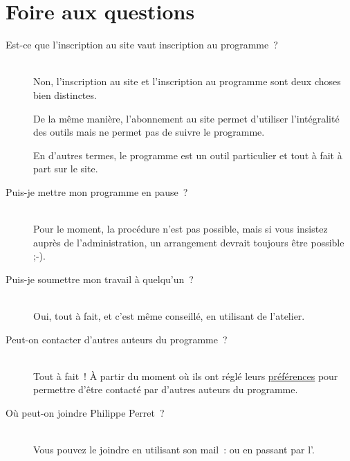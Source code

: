 % 
% 
% 
% 
% 
% 
% 
% 

\section{Foire aux questions}\hypertarget{faq}{}\label{faq}

\begin{description}
\item[Est-ce que l'inscription au site vaut inscription au programme~{}?] \hfill \\
 Non, l'inscription au site \boa{} et l'inscription au programme \unan{} sont deux choses bien distinctes.



De la même manière, l'abonnement au site permet d'utiliser l'intégralité des outils mais ne permet pas de suivre le programme.



En d'autres termes, le programme \unan{} est un outil particulier et tout à fait à part sur le site.



\item[Puis-je mettre mon programme en pause~{}?] \hfill \\
 Pour le moment, la procédure n'est pas possible, mais si vous insistez auprès de l'administration, un arrangement devrait toujours être possible ;-).



\item[Puis-je soumettre mon travail à quelqu'un~{}?] \hfill \\
 Oui, tout à fait, et c'est même conseillé, en utilisant \leForum{} de l'atelier.



\item[Peut-on contacter d'autres auteurs du programme~{}?] \hfill \\
 Tout à fait~{}! À partir du moment où ils ont réglé leurs \hyperlink{preferences-auteur}{préférences} pour permettre d'être contacté par d'autres auteurs du programme.



\item[Où peut-on joindre Philippe Perret~{}?] \hfill \\
 Vous pouvez le joindre en utilisant son mail~{}:  ou en passant par l'.
\end{description}

